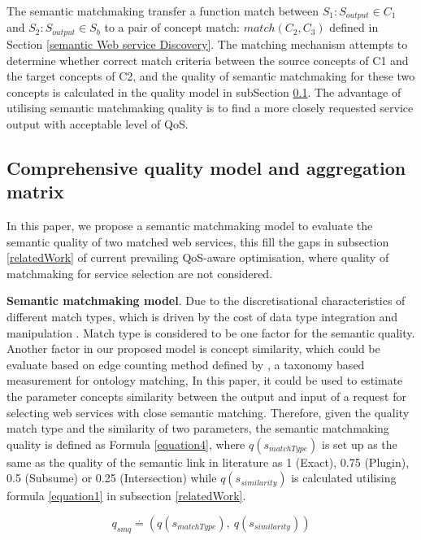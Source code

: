 \documentclass{llncs}
\begin{document}
The semantic matchmaking transfer a function match between $S_{1}: S_{output} \in C_{1}$ and $S_{2}:S_{output} \in S_{b}$ to a pair of concept match: $match(C_{2}, C_{3})$ defined in Section \ref{semantic Web service Discovery}. The matching mechanism attempts to determine whether correct match criteria between the source concepts of C1 and the target concepts of C2, and the quality of semantic matchmaking for these two concepts is calculated in the quality model in subSection \ref{qualityModel}. The advantage of utilising semantic matchmaking quality is to find a more closely requested service output with acceptable level of QoS.

\subsection{Comprehensive quality model and aggregation matrix}\label{qualityModel}
In this paper, we propose a semantic matchmaking model to evaluate the semantic quality of two matched web services, this fill the gaps in subsection \ref{relatedWork} of current prevailing QoS-aware optimisation, where quality of matchmaking for service selection are not considered.

\textbf{Semantic matchmaking model}. Due to the discretisational characteristics of different match types, which is driven by the cost of  data type integration and manipulation \cite{lecue2009optimizing}. Match type is considered to be one factor for the semantic quality. Another factor in our proposed model is concept similarity, which could be evaluate based on edge counting method defined by \cite{shet2012new}, a taxonomy based measurement for ontology matching, In this paper, it could be used to estimate the parameter concepts similarity between the output and input of a request for selecting web services with close semantic matching. Therefore, given the quality match type and the similarity of two parameters, the semantic matchmaking quality is defined as Formula \ref{equation4}, where $q(s_ {matchType})$ is set up as the same as the quality of the semantic link in literature \cite{lecue2009optimizing} as 1 (Exact), 0.75 (Plugin), 0.5 (Subsume) or 0.25 (Intersection) while $q(s_ {similarity})$ is calculated utilising formula \ref{equation1} in subsection \ref{relatedWork}.

\begin{equation}
\label{equation4}
q_{smq} \stackrel{.}{=} (q(s_ {matchType}), \  q(s_ {similarity}))
\end{equation}
\end{document}
